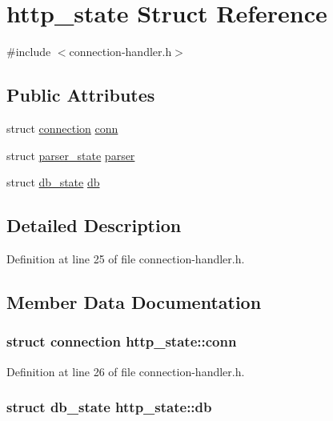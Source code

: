 \hypertarget{structhttp__state}{\section{http\-\_\-state Struct Reference}
\label{structhttp__state}
}


{\ttfamily \#include $<$connection-\/handler.\-h$>$}

\subsection*{Public Attributes}
\begin{DoxyCompactItemize}
\item 
struct \hyperlink{structconnection}{connection} \hyperlink{structhttp__state_af220a1e33cf7177d4d4ca101a46547ec}{conn}
\item 
struct \hyperlink{structparser__state}{parser\-\_\-state} \hyperlink{structhttp__state_a3eda42ab7c2b2dfbc61a1cc5eb076555}{parser}
\item 
struct \hyperlink{structdb__state}{db\-\_\-state} \hyperlink{structhttp__state_a7b27d01030cc535f0cfe1254f452f243}{db}
\end{DoxyCompactItemize}


\subsection{Detailed Description}


Definition at line 25 of file connection-\/handler.\-h.



\subsection{Member Data Documentation}
\hypertarget{structhttp__state_af220a1e33cf7177d4d4ca101a46547ec}{
\subsubsection[{conn}]{\setlength{\rightskip}{0pt plus 5cm}struct {\bf connection} http\-\_\-state\-::conn}}\label{structhttp__state_af220a1e33cf7177d4d4ca101a46547ec}


Definition at line 26 of file connection-\/handler.\-h.

\hypertarget{structhttp__state_a7b27d01030cc535f0cfe1254f452f243}{
\subsubsection[{db}]{\setlength{\rightskip}{0pt plus 5cm}struct {\bf db\-\_\-state} http\-\_\-state\-::db}}\label{structhttp__state_a7b27d01030cc535f0cfe1254f452f243}


